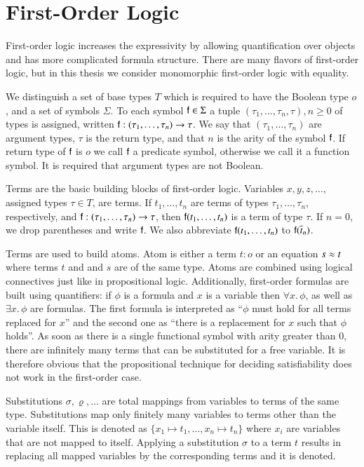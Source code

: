 \section{First-Order Logic}

First-order logic increases the expressivity by allowing quantification over
objects and has more complicated formula structure. There are many flavors of
first-order logic, but in this thesis we consider monomorphic first-order logic
with equality.

We distinguish a set of base types $T$ which is required to have the Boolean
type $o$, and a set of symbols $\Sigma$. To each symbol $\mathsf{f} \in \Sigma$ a
tuple $(\tau_1, \ldots, \tau_{n}, \tau), n \geq 0$ of types is assigned, written
$\mathsf{f} : (\tau_1, \ldots, \tau_{n}) \rightarrow \tau$. We say that $(\tau_1,
\ldots, \tau_{n})$ are argument types, $\tau$ is the return type, and that $n$
is the arity of the symbol $\mathsf{f}$. If return type of $\mathsf{f}$ is $o$ we call
$\mathsf{f}$ a predicate symbol, otherwise we call it a function symbol. It is
required that argument types are not Boolean.

Terms are the basic building blocks of first-order logic. Variables
$x,y,z,\ldots$, assigned types $\tau \in T$, are terms. If $t_1,\ldots,t_n$ are
terms of types $\tau_1, \ldots, \tau_n$, respectively, and $\mathsf{f} : (\tau_1,
\ldots, \tau_{n}) \rightarrow \tau$, then $\mathsf{f}(t_1, \ldots, t_n)$ is a term
of type $\tau$. If $n=0$, we drop parentheses and write $\mathsf{f}$. We also
abbreviate $\mathsf{f}(t_1, \ldots, t_n)$ to $\mathsf{f}(\overline{t}_{n})$.

Terms are used to build atoms. Atom is either a term $t : o$ or an equation $s
\approx t$ where terms $t$ and and $s$ are of the same type. Atoms are combined
using logical connectives just like in propositional logic. Additionally,
first-order formulas are built using quantifiers: if $\phi$ is a formula and $x$
is a variable then $\forall x.\, \phi$, as well as $\exists x.\, \phi$ are
formulas. The first formula is interpreted as ``$\phi$ must hold for all terms
replaced for $x$'' and the second one as ``there is a replacement for $x$ such
that $\phi$ holds''. As soon as there is a single functional symbol with arity
greater than 0, there are infinitely many terms that can be substituted for a
free variable. It is therefore obvious that the propositional technique for
deciding satisfiability does not work in the first-order case.

Substitutions $\sigma, \varrho, \ldots$ are total mappings from variables to
terms of the same type. Substitutions map only finitely many variables to terms
other than the variable itself. This is denoted as $\{ x_1 \mapsto t_1, \ldots,
x_n \mapsto t_n \}$ where $x_i$ are variables that are not mapped to itself. 
Applying a substitution $\sigma$ to a term $t$ results in replacing all mapped variables 
by the corresponding terms and it is denoted.
